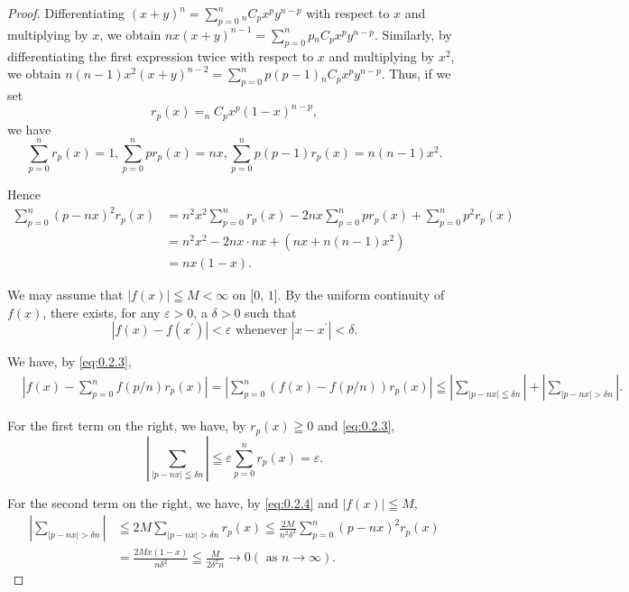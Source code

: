 \begin{proof}
 Differentiating $(x + y)^n = \sum\limits_{p=0}^{n} {}_n C_p x^p y^{n-p}$ with respect to $x$ and multiplying by $x$, we obtain $nx(x + y)^{n-1} = \sum\limits_{p=0}^{n} p {}_n C_p x^p y^{n-p}$. Similarly, by differentiating the first expression twice with respect to $x$ and multiplying by $x^2$, we obtain $n(n-1)x^2(x + y)^{n-2} = \sum\limits_{p=0}^{n} p(p-1) {}_n C_p x^p y^{n-p}$. Thus, if we set 
\begin{equation}\label{eq:0.2.2}
r _{p} (x) = _{n} C _{p} x ^{p} (1- x) ^{n-p},
\end{equation}
we have 
\begin{equation}\label{eq:0.2.3}
\sum\limits_{p=0} ^{n} r _{p} (x) = 1, \sum\limits_{p=0} ^{n} p r _{p} (x) = n x, \sum\limits_{p=0} ^{n} p (p- 1) r _{p} (x) = n (n- 1) x ^{2}.
\end{equation}

Hence 
\begin{equation}\label{eq:0.2.4}
\begin{aligned} \sum\limits_{p=0} ^{n} (p- n x) ^{2} r _{p} (x) & = n ^{2} x ^{2} \sum\limits_{p=0} ^{n} r _{p} (x)- 2 n x \sum\limits_{p=0} ^{n} p r _{p} (x) + \sum\limits_{p=0} ^{n} p ^{2} r _{p} (x) \\ & = n ^{2} x ^{2}- 2 n x \cdot n x + (n x + n (n- 1) x ^{2}) \\ & = n x (1- x). \end{aligned}
\end{equation}

We may assume that $|f(x)| \leqq M < \infty$ on [$0$, $1$]. By the uniform continuity of $f(x)$, there exists, for any $\varepsilon > 0$, a $\delta > 0$ such that 
\begin{equation}\label{eq:0.2.5}
\left| f (x)- f \left(x ^{\prime}\right) \right| < \varepsilon \text{ whenever } \left| x- x ^{\prime} \right| < \delta .
\end{equation}

We have, by \eqref{eq:0.2.3}, 
\[
\begin{aligned}
&\left| f (x)- \sum\limits_{p=0} ^{n} f (p / n) r _{p} (x) \right| = \left| \sum\limits_{p=0} ^{n} (f (x)- f (p / n)) r _{p} (x) \right| \leqq \left| \sum\limits_{| p- n x | \leqq \delta n} \right| + \left| \sum\limits_{| p- n x | > \delta n} \right|.
\end{aligned}
\]

For the first term on the right, we have, by $r_{p}(x) \geqq 0$ and \eqref{eq:0.2.3}, 
\[
\left| \sum\limits_{| p- n x | \leqq \delta n} \right| \leqq \varepsilon \sum\limits_{p=0} ^{n} r _{p} (x) = \varepsilon .
\]

For the second term on the right, we have, by \eqref{eq:0.2.4} and $|f(x)| \leqq M$, 
\[ \begin{aligned}\left| \sum\limits_{| p- n x | > \delta n} \right|&\leqq 2 M \sum\limits_{| p- n x | > \delta n} r _{p} (x) \leqq \frac {2 M}{n ^{2} \delta^{2}} \sum\limits_{p=0} ^{n} (p- n x) ^{2} r _{p} (x)\\&= \frac {2 M x (1- x)}{n \delta^{2}} \leqq \frac {M}{2 \delta^{2} n} \rightarrow 0 (\text{ as } n \rightarrow \infty).\end{aligned}
\]
\end{proof}
